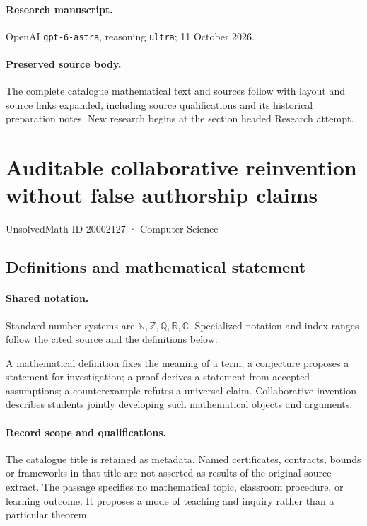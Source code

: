 \documentclass[11pt]{article}
\begin{document}
\paragraph{Research manuscript.} OpenAI \texttt{gpt-6-astra}, reasoning \texttt{ultra}; 11 October 2026.
\paragraph{Preserved source body.} The complete catalogue mathematical text and sources follow with layout and source links expanded, including source qualifications and its historical preparation notes. New research begins at the section headed Research attempt.

\section{Auditable collaborative reinvention without false authorship claims}\label{20002127}
{\small UnsolvedMath ID 20002127 · Computer Science}
\subsection{Definitions and mathematical statement}

\paragraph{Shared notation.}Standard number systems are $\mathbb N,\mathbb Z,\mathbb Q,\mathbb R,\mathbb C$. Specialized notation and index ranges follow the cited source and the definitions below.


A mathematical definition fixes the meaning of a term; a conjecture proposes a statement for investigation; a proof derives a statement from accepted assumptions; a counterexample refutes a universal claim. Collaborative invention describes students jointly developing such mathematical objects and arguments.
\paragraph{Record scope and qualifications.}
The catalogue title is retained as metadata. Named certificates, contracts, bounds or frameworks in that title are not asserted as results of the original source extract.
The passage specifies no mathematical topic, classroom procedure, or learning outcome. It proposes a mode of teaching and inquiry rather than a particular theorem.
\end{document}
